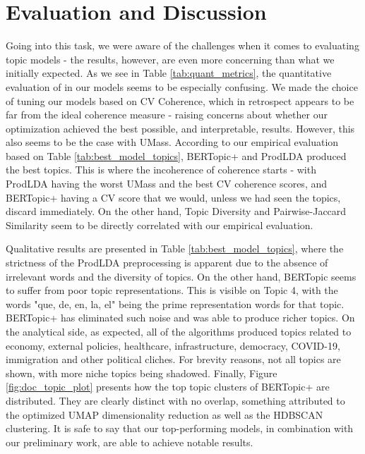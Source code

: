 \section{Evaluation and Discussion}
\label{sec:Discussion}

Going into this task, we were aware of the challenges when it comes to evaluating topic models - the results, however, are even more concerning than what we initially expected. As we see in Table \ref{tab:quant_metrics}, the quantitative evaluation of in our models seems to be especially confusing. We made the choice of tuning our models based on CV Coherence, which in retrospect appears to be far from the ideal coherence measure - raising concerns about whether our optimization achieved the best possible, and interpretable, results. However, this also seems to be the case with UMass. According to our empirical evaluation based on Table \ref{tab:best_model_topics}, BERTopic+ and ProdLDA produced the best topics. This is where the incoherence of coherence starts - with ProdLDA having the worst UMass and the best CV coherence scores, and BERTopic+ having a CV score that we would, unless we had seen the topics, discard immediately. On the other hand, Topic Diversity and Pairwise-Jaccard Similarity seem to be directly correlated with our empirical evaluation. 

Qualitative results are presented in Table \ref{tab:best_model_topics}, where the strictness of the ProdLDA preprocessing is apparent due to the absence of irrelevant words and the diversity of topics. On the other hand, BERTopic seems to suffer from poor topic representations. This is visible on Topic 4, with the words "que, de, en, la, el" being the prime representation words for that topic. BERTopic+ has eliminated such noise and was able to produce richer topics. On the analytical side, as expected, all of the algorithms produced topics related to economy, external policies, healthcare, infrastructure, democracy, COVID-19, immigration and other political cliches. For brevity reasons, not all topics are shown, with more niche topics being shadowed. Finally, Figure \ref{fig:doc_topic_plot} presents how the top topic clusters of BERTopic+ are distributed. They are clearly distinct with no overlap, something attributed to the optimized UMAP dimensionality reduction as well as the HDBSCAN clustering. It is safe to say that our top-performing models, in combination with our preliminary work, are able to achieve notable results.

